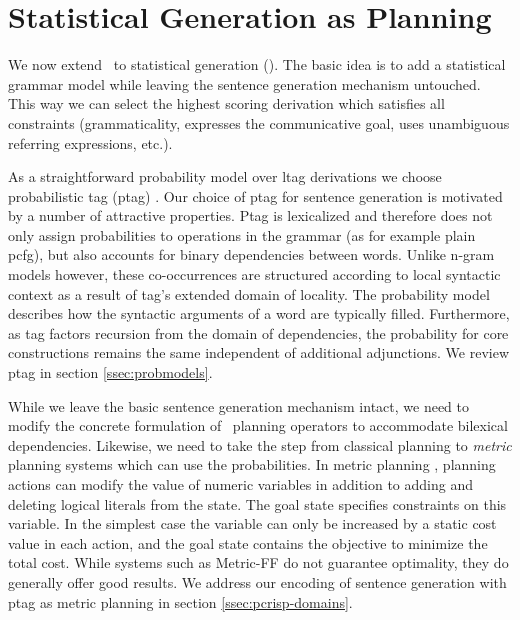 \section{Statistical Generation as Planning}
\label{sec:pcrisp}

We now extend \crisp\ to statistical generation (\pcrisp). The basic idea is to add a statistical grammar model while leaving the sentence generation mechanism untouched. This way we can select the highest scoring derivation which satisfies all constraints (grammaticality, expresses the communicative goal, uses unambiguous referring expressions, etc.). 

 As a straightforward probability model over {\sc ltag} derivations we choose probabilistic {\sc tag} ({\sc ptag}) \cite{resnik1992}.
Our choice of {\sc ptag} for sentence generation is motivated by a number of attractive properties.
 {\sc Ptag} is lexicalized and therefore does not only assign probabilities to operations in the grammar (as for example plain {\sc pcfg}), but also accounts for binary dependencies between words.  Unlike n-gram models however, these co-occurrences are structured according to local syntactic context as a result of {\sc tag}'s extended domain of locality. The probability model describes how the syntactic arguments of a word are typically filled. 
Furthermore, as {\sc tag} factors recursion from the domain of dependencies, the probability for core constructions remains the same independent of additional adjunctions. 
 We review {\sc ptag} in section \ref{ssec:probmodels}.

While we leave the basic sentence generation mechanism intact, we need to modify the concrete formulation of \crisp\ planning operators to accommodate bilexical dependencies. Likewise, we need to take the step from classical planning to \emph{metric} planning systems which can use the probabilities.
In metric planning \cite{fox2002}, planning actions can modify the value of numeric variables in addition to adding and deleting logical literals from the state. The goal state specifies constraints on this variable. In the simplest case the variable can only be increased by a static cost value in each action, and the goal state contains the objective to minimize the total cost. While systems such as Metric-{\sc FF} \cite{hoffmann2003} do not guarantee optimality, they do generally offer good results. We address our encoding of sentence generation with {\sc ptag} as metric planning in section \ref{ssec:pcrisp-domains}. 

